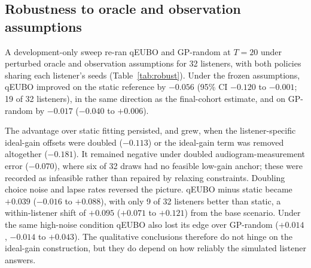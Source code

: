 \documentclass[preprint,12pt]{elsarticle}
\begin{document}
\subsection{Robustness to oracle and observation assumptions}
\label{sec:robust}

A development-only sweep re-ran qEUBO and GP-random at $T=20$ under perturbed oracle and observation assumptions for 32 listeners, with both policies sharing each listener's seeds (Table~\ref{tab:robust}). Under the frozen assumptions, qEUBO improved on the static reference by $-0.056$ (95\% CI $-0.120$ to $-0.001$; 19 of 32 listeners), in the same direction as the final-cohort estimate, and on GP-random by $-0.017$ ($-0.040$ to $+0.006$).

The advantage over static fitting persisted, and grew, when the listener-specific ideal-gain offsets were doubled ($-0.113$) or the ideal-gain term was removed altogether ($-0.181$). It remained negative under doubled audiogram-measurement error ($-0.070$), where six of 32 draws had no feasible low-gain anchor; these were recorded as infeasible rather than repaired by relaxing constraints. Doubling choice noise and lapse rates reversed the picture. qEUBO minus static became $+0.039$ ($-0.016$ to $+0.088$), with only 9 of 32 listeners better than static, a within-listener shift of $+0.095$ ($+0.071$ to $+0.121$) from the base scenario. Under the same high-noise condition qEUBO also lost its edge over GP-random ($+0.014$, $-0.014$ to $+0.043$). The qualitative conclusions therefore do not hinge on the ideal-gain construction, but they do depend on how reliably the simulated listener answers.

\begin{table}[!htbp]
\centering
\caption{Development-only robustness sweep (seed 424242; qEUBO and GP-random at $T=20$; listener-level 95\% bootstrap CIs). $n$: listeners with a feasible low-gain anchor. Negative differences favour qEUBO.}
\label{tab:robust}
\end{table}
\end{document}
